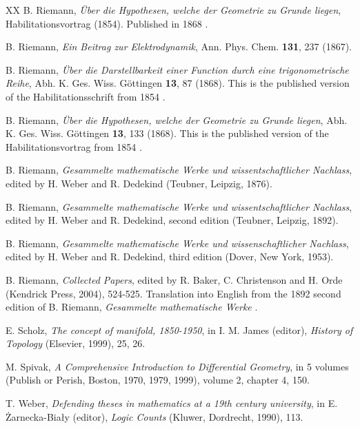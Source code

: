 \documentclass[12pt]{article}
\begin{document}
\begin{thebibliography}{XX}
B. Riemann, {\it \"Uber die Hypothesen, welche der Geometrie zu Grunde liegen}, Habilitationsvortrag (1854). Published in 1868 \cite{Riemann1868b}.

B. Riemann, {\it Ein Beitrag zur Elektrodynamik}, Ann. Phys. Chem. {\bf 131}, 237 (1867).

B. Riemann, {\it \"Uber die Darstellbarkeit einer Function durch eine trigonometrische Reihe}, Abh. K. Ges. Wiss. G\"ottingen {\bf 13}, 87 (1868). This is the published version of the Habilitationsschrift from 1854 \cite{Riemann1854a}.

B. Riemann, {\it \"Uber die Hypothesen, welche der Geometrie zu Grunde liegen}, Abh. K. Ges. Wiss. G\"ottingen {\bf 13}, 133 (1868). This is the published version of the  Habilitationsvortrag from 1854 \cite{Riemann1854b}.

B. Riemann, {\it Gesammelte mathematische Werke und wissentschaftlicher Nachlass}, edited by H. Weber and R. Dedekind (Teubner, Leipzig, 1876).

B. Riemann, {\it Gesammelte mathematische Werke und wissentschaftlicher Nachlass}, edited by H. Weber and R. Dedekind, second edition (Teubner, Leipzig, 1892).

B. Riemann, {\it Gesammelte mathematische Werke und wissenschaftlicher Nachlass}, edited by H. Weber and R. Dedekind, third edition (Dover, New York, 1953).

B. Riemann, {\it Collected Papers}, edited by R. Baker, C. Christenson and H. Orde (Kendrick Press, 2004), 524-525. Translation into English from the 1892 second edition of B. Riemann, {\it Gesammelte mathematische Werke} \cite{Riemann1892}.

E. Scholz, {\it The concept of manifold, 1850-1950}, in I. M. James (editor), {\it History of Topology} (Elsevier, 1999), 25, 26.

M. Spivak, {\it A Comprehensive Introduction to Differential Geometry}, in 5 volumes (Publish or Perish, Boston, 1970, 1979, 1999), volume 2, chapter 4, 150.

T. Weber, {\it Defending theses in mathematics at a 19th century university}, in E. \.Zarnecka-Bia\l y (editor), {\it Logic Counts} (Kluwer, Dordrecht, 1990), 113.

\end{thebibliography}

\end{document}
